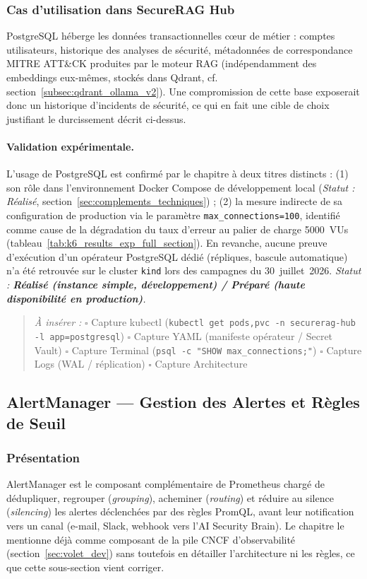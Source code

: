 \subsubsection{Cas d'utilisation dans SecureRAG Hub}
PostgreSQL héberge les données transactionnelles cœur de métier : comptes utilisateurs, historique des analyses de sécurité, métadonnées de correspondance MITRE ATT\&CK produites par le moteur RAG (indépendamment des embeddings eux-mêmes, stockés dans Qdrant, cf. section~\ref{subsec:qdrant_ollama_v2}). Une compromission de cette base exposerait donc un historique d'incidents de sécurité, ce qui en fait une cible de choix justifiant le durcissement décrit ci-dessus.

\paragraph{Validation expérimentale.}
L'usage de PostgreSQL est confirmé par le chapitre à deux titres distincts : (1) son rôle dans l'environnement Docker Compose de développement local (\textit{Statut : Réalisé}, section~\ref{sec:complements_techniques}) ; (2) la mesure indirecte de sa configuration de production via le paramètre \texttt{max\_connections=100}, identifié comme cause de la dégradation du taux d'erreur au palier de charge 5000~VUs (tableau~\ref{tab:k6_results_exp_full_section}). En revanche, aucune preuve d'exécution d'un opérateur PostgreSQL dédié (répliques, bascule automatique) n'a été retrouvée sur le cluster \texttt{kind} lors des campagnes du 30~juillet~2026. \textit{Statut : \textbf{Réalisé (instance simple, développement) / Préparé (haute disponibilité en production)}.}

\begin{quote}
\scriptsize
\textit{À insérer :} \quad
$\square$ Capture kubectl (\texttt{kubectl get pods,pvc -n securerag-hub -l app=postgresql}) \quad
$\square$ Capture YAML (manifeste opérateur / Secret Vault) \quad
$\square$ Capture Terminal (\texttt{psql -c "SHOW max\_connections;"}) \quad
$\square$ Capture Logs (WAL / réplication) \quad
$\square$ Capture Architecture
\end{quote}


\subsection{AlertManager — Gestion des Alertes et Règles de Seuil}
\label{subsec:alertmanager_v2}

\subsubsection{Présentation}
AlertManager est le composant complémentaire de Prometheus chargé de dédupliquer, regrouper (\textit{grouping}), acheminer (\textit{routing}) et réduire au silence (\textit{silencing}) les alertes déclenchées par des règles PromQL, avant leur notification vers un canal (e-mail, Slack, webhook vers l'AI Security Brain). Le chapitre le mentionne déjà comme composant de la pile CNCF d'observabilité (section~\ref{sec:volet_dev}) sans toutefois en détailler l'architecture ni les règles, ce que cette sous-section vient corriger.

